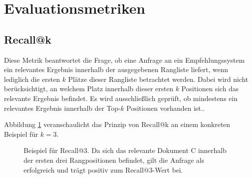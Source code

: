 \section{Evaluationsmetriken}
\label{sec:evaluationsmetriken}

\subsection{Recall@k} 

Diese Metrik beantwortet die Frage, ob eine Anfrage an ein Empfehlungssystem ein relevantes Ergebnis innerhalb der ausgegebenen Rangliste liefert, wenn lediglich die ersten $k$ Plätze dieser Rangliste betrachtet werden. 
Dabei wird nicht berücksichtigt, an welchem Platz innerhalb dieser ersten $k$ Positionen sich das relevante Ergebnis befindet. 
Es wird ausschließlich geprüft, ob mindestens ein relevantes Ergebnis innerhalb der Top-$k$ Positionen vorhanden ist.\parencite{manning2008ir}.

Abbildung \ref{fig:recall_at_3} veranschaulicht das Prinzip von Recall@k an einem konkreten Beispiel für $k=3$.

\begin{figure}[H] 
  \centering {} 
  \caption{Beispiel für Recall@3. Da sich das relevante Dokument C innerhalb der ersten drei Rangpositionen befindet, gilt die Anfrage als erfolgreich und trägt positiv zum Recall@3-Wert bei.} 
  \label{fig:recall_at_3} 
\end{figure}

